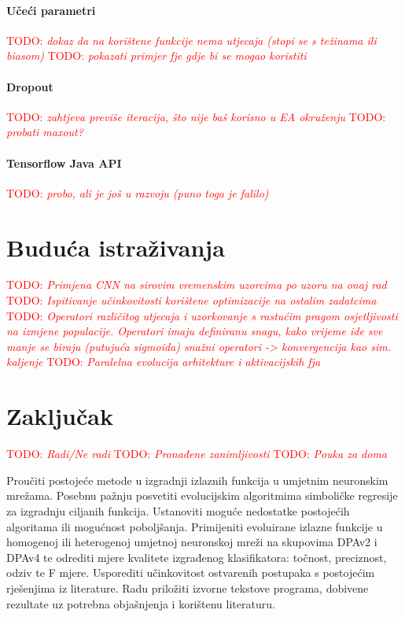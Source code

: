 \documentclass[times, utf8, numeric, diplomski]{fer}
\def\TODO#1{\noindent\textcolor{red}{TODO: \textit{#1}}\newline}
\def\todo#1{\TODO{#1}}
\begin{document}
\subsubsection{Učeći parametri}
\todo{dokaz da na korištene funkcije nema utjecaja (stopi se s težinama ili biasom)}
\todo{pokazati primjer fje gdje bi se mogao koristiti}

\subsubsection{Dropout}
\todo{zahtjeva previše iteracija, što nije baš korisno u EA okruženju}
\todo{probati maxout?}

\subsubsection{Tensorflow Java API}
\todo{probo, ali je još u razvoju (puno toga je falilo)}

\chapter{Buduća istraživanja}
\todo{Primjena CNN na sirovim vremenskim uzorcima po uzoru na onaj rad}
\todo{Ispitivanje učinkovitosti korištene optimizacije na ostalim zadatcima}
\todo{Operatori različitog utjecaja i uzorkovanje s rastućim pragom osjetljivosti na izmjene populacije. Operatori imaju definiranu snagu, kako vrijeme ide sve manje se biraju (putujuća sigmoida) snažni operatori -> konvergencija kao sim. kaljenje}
\todo{Paralelna evolucija arhitekture i aktivacijskih fja \citep{cnn_evolution}}

\chapter{Zaključak}
\todo{Radi/Ne radi}
\todo{Pronađene zanimljivosti}
\todo{Pouka za doma}




\begin{sazetak}
Proučiti postojeće metode u izgradnji izlaznih funkcija u umjetnim neuronskim mrežama. Posebnu pažnju posvetiti evolucijskim algoritmima simboličke regresije za izgradnju ciljanih funkcija. Ustanoviti moguće nedostatke postojećih algoritama ili mogućnost poboljšanja. Primijeniti evoluirane izlazne funkcije u homogenoj ili heterogenoj umjetnoj neuronskoj mreži na skupovima DPAv2 i DPAv4 te odrediti mjere kvalitete izgrađenog klasifikatora: točnost, preciznost, odziv te F mjere. Usporediti učinkovitost ostvarenih postupaka s postojećim rješenjima iz literature. Radu priložiti izvorne tekstove programa, dobivene rezultate uz potrebna objašnjenja i korištenu literaturu.

\end{sazetak}
\end{document}
